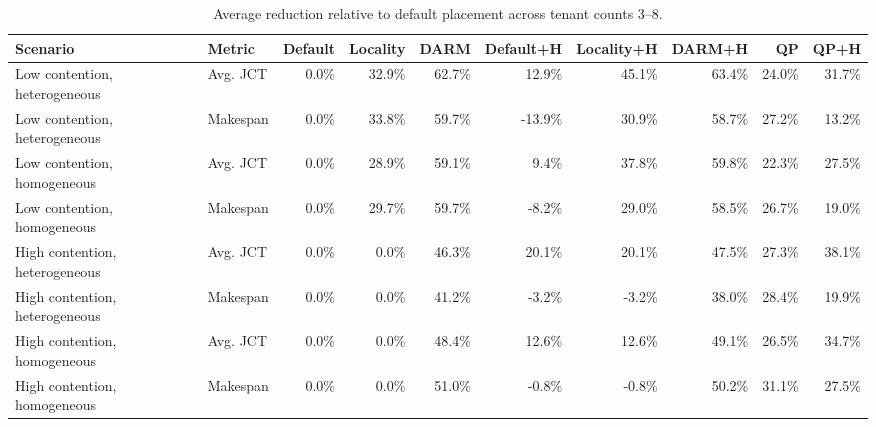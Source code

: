 \begin{table}[t]
\centering
\caption{Average reduction relative to default placement across tenant counts 3--8.}
\label{tab:main-result-summary}
\begin{tabular}{llrrrrrrrr}
\toprule
Scenario & Metric & Default & Locality & DARM & Default+H & Locality+H & DARM+H & QP & QP+H \\
\midrule
Low contention, heterogeneous & Avg. JCT & 0.0\% & 32.9\% & 62.7\% & 12.9\% & 45.1\% & 63.4\% & 24.0\% & 31.7\% \\
Low contention, heterogeneous & Makespan & 0.0\% & 33.8\% & 59.7\% & -13.9\% & 30.9\% & 58.7\% & 27.2\% & 13.2\% \\
Low contention, homogeneous & Avg. JCT & 0.0\% & 28.9\% & 59.1\% & 9.4\% & 37.8\% & 59.8\% & 22.3\% & 27.5\% \\
Low contention, homogeneous & Makespan & 0.0\% & 29.7\% & 59.7\% & -8.2\% & 29.0\% & 58.5\% & 26.7\% & 19.0\% \\
High contention, heterogeneous & Avg. JCT & 0.0\% & 0.0\% & 46.3\% & 20.1\% & 20.1\% & 47.5\% & 27.3\% & 38.1\% \\
High contention, heterogeneous & Makespan & 0.0\% & 0.0\% & 41.2\% & -3.2\% & -3.2\% & 38.0\% & 28.4\% & 19.9\% \\
High contention, homogeneous & Avg. JCT & 0.0\% & 0.0\% & 48.4\% & 12.6\% & 12.6\% & 49.1\% & 26.5\% & 34.7\% \\
High contention, homogeneous & Makespan & 0.0\% & 0.0\% & 51.0\% & -0.8\% & -0.8\% & 50.2\% & 31.1\% & 27.5\% \\
\bottomrule
\end{tabular}
\end{table}

